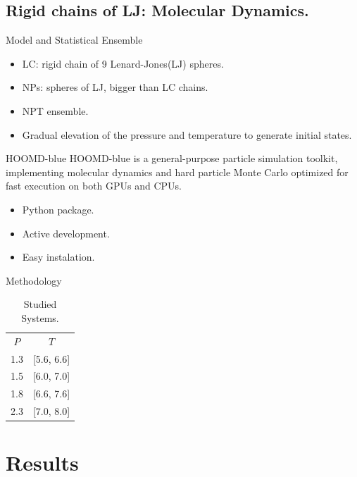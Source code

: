 \documentclass{beamer}
\begin{document}
\subsection{Rigid chains of LJ: Molecular Dynamics.}

\begin{frame}{Model and Statistical Ensemble}
    \begin{itemize}
        \item LC: rigid chain of 9 Lenard-Jones(LJ) spheres.
        \item NPs: spheres of LJ, bigger than LC chains.
        \item NPT ensemble.
        \item Gradual elevation of the pressure and temperature to generate initial states.
    \end{itemize}
\end{frame}

\begin{frame}{HOOMD-blue}
HOOMD-blue is a general-purpose particle simulation toolkit, implementing molecular dynamics and hard particle Monte Carlo optimized for fast execution on both GPUs and CPUs.
    \begin{itemize}
        \item Python package.
        \item Active development.
        \item Easy instalation.
    \end{itemize}
\end{frame}

\begin{frame}{Methodology}
    
    \begin{table}
        \centering
        \begin{tabular}{cc}
            $P$ & $T$\\
             1.3 & [5.6, 6.6] \\
             1.5 & [6.0, 7.0] \\
             1.8 & [6.6, 7.6] \\
             2.3 & [7.0, 8.0] \\
        \end{tabular}
        \caption{Studied Systems.}
        \label{tab:my_label}
    \end{table}
\end{frame}


\section{Results}
\end{document}
